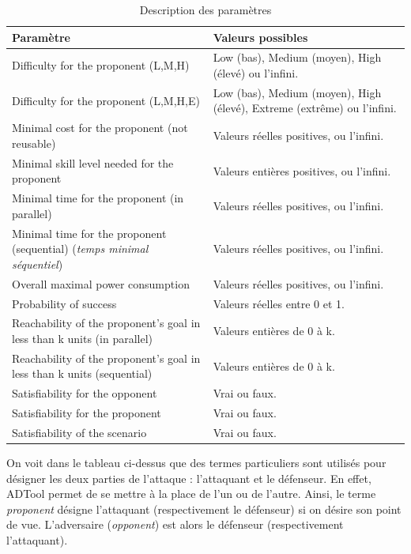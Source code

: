 			\begin{table}[!h]
				\centering
				\begin{tabular}{|p{6cm}|p{5cm}|}
					\hline
					\textbf{Paramètre} & \textbf{Valeurs possibles} \\
					\hline
					Difficulty for the proponent (L,M,H) & 
						Low (bas), Medium (moyen), High (élevé) ou l'infini.\\ 
					\hline
					Difficulty for the proponent (L,M,H,E) & 
						Low (bas), Medium (moyen), High (élevé), Extreme (extrême) ou l'infini.\\ 
					\hline
					Minimal cost for the proponent (not reusable) & 
						Valeurs réelles positives, ou l'infini.\\ 
					\hline
					Minimal skill level needed for the proponent & 
						Valeurs entières positives, ou l'infini.\\ 
					\hline
					Minimal time for the proponent (in parallel) & 
						Valeurs réelles positives, ou l'infini.\\ 
					\hline
					Minimal time for the proponent (sequential) (\textit{temps minimal séquentiel}) & 
						Valeurs réelles positives, ou l'infini.\\ 
					\hline
					Overall maximal power consumption & 
						Valeurs réelles positives, ou l'infini.\\ 
					\hline
					Probability of success &
						Valeurs réelles entre 0 et 1.\\ 
					\hline
					Reachability of the proponent's goal in less than k units (in parallel) & 
						Valeurs entières de 0 à k. \\ 
					\hline
					Reachability of the proponent's goal in less than k units (sequential) & 
						Valeurs entières de 0 à k. \\ 
					\hline
					Satisfiability for the opponent & 
						Vrai ou faux. \\ 
					\hline
					Satisfiability for the proponent & 
						Vrai ou faux. \\ 
					\hline
					Satisfiability of the scenario & 
						Vrai ou faux. \\
					\hline
				\end{tabular}
				\caption{Description des paramètres}
				\label{tab:DescriptionParam}
			\end{table}

			On voit dans le tableau ci-dessus que des termes particuliers sont utilisés pour désigner les deux parties de l'attaque : l'attaquant et le défenseur. En effet, ADTool permet de se mettre à la place de l'un ou de l'autre. Ainsi, le terme \textit{proponent} désigne l'attaquant (respectivement le défenseur) si on désire son point de vue. L'adversaire (\textit{opponent}) est alors le défenseur (respectivement l'attaquant). %

